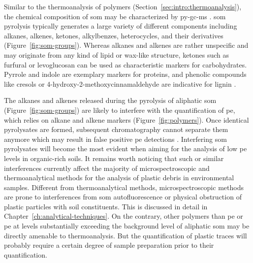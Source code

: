 Similar to the thermoanalysis of polymers (Section~\ref{sec:intro:thermoanalysis}), the chemical composition of \ac{som} may be characterized by \ac{py-gc-ms} \citep{CeccantiPyrolysisgas2007,HatcherModern2001}. \Ac{som} pyrolysis typically generates a large variety of different components including alkanes, alkenes, ketones, alkylbenzes, heterocycles, and their derivatives (Figure~\ref{fig:som-groups}). Whereas alkanes and alkenes are rather unspecific and may originate from any kind of lipid or wax-like structure, ketones such as furfural or levoglucosan can be used as characteristic markers for carbohydrates. Pyrrole and indole are exemplary markers for proteins, and phenolic compounds like cresols or 4-hydroxy-2-methoxycinnamaldehyde are indicative for lignin \citep[Figure~\ref{fig:som-groups};][]{HatcherModern2001}.

The alkanes and alkenes released during the pyrolysis of aliphatic \ac{som} (Figure~\ref{fig:som-groups}) are likely to interfere with the quantification of \ac{pe}, which relies on alkane and alkene markers (Figure~\ref{fig:polymers}). Once identical pyrolysates are formed, subsequent chromatography cannot separate them anymore which may result in false positive \ac{pe} detections \citep{DumichenAnalysis2015}. Interfering \ac{som} pyrolysates will become the most evident when aiming for the analysis of low \ac{pe} levels in organic-rich soils.
It remains worth noticing that such or similar interferences currently affect the majority of microspectroscopic and thermoanalytical methods for the analysis of plastic debris in environmental samples. Different from thermoanalytical methods, microspectroscopic methods are prone to interferences from \ac{som} autofluorescence or physical obstruction of plastic particles with soil constituents. This is discussed in detail in Chapter~\ref{ch:analytical-techniques}.
On the contrary, other polymers than \ac{pe} or \ac{pe} at levels substantially exceeding the background level of aliphatic \ac{som} may be directly amenable to thermoanalysis. But the quantification of plastic traces will probably require a certain degree of sample preparation prior to their quantification.

